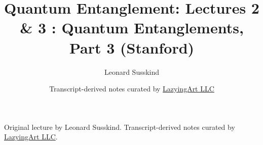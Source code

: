 \documentclass[11pt,oneside]{book}
\begin{document}
\frontmatter
\title{Quantum Entanglement: Lectures 2 \& 3 : Quantum Entanglements, Part 3 (Stanford)}
\author{Leonard Susskind}
\date{Transcript-derived notes curated by \href{https://lazying.art}{LazyingArt LLC}}
\maketitle
\begin{center}
\small Original lecture by Leonard Susskind. Transcript-derived notes curated by \href{https://lazying.art}{LazyingArt LLC}.
\end{center}
\clearpage
\mainmatter

\end{document}
